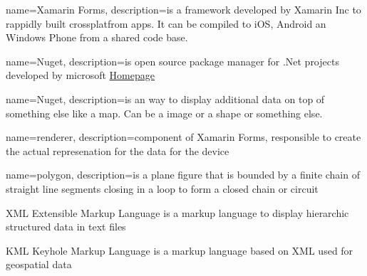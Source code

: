 
{
  name=Xamarin Forms,
  description={is a framework developed by Xamarin Inc to rappidly built crossplatfrom apps. It can be compiled to iOS, Android an Windows Phone from a shared code base.}
}

{
  name=Nuget,
  description={is open source package manager for .Net projects developed by microsoft
  \href{http://nuget.codeplex.com/}{Homepage} }
}

{
  name=Nuget,
  description={is an way to display additional data on top of something else like a map. Can be a image or a shape or something else.}
}

{
  name=renderer,
  description={component of Xamarin Forms, responsible to create the actual represenation for the data for the device}
}

{
  name=polygon,
  description={is a plane figure that is bounded by a finite chain of straight line segments closing in a loop to form a closed chain or circuit}
}

  {XML}            %
  {Extensible Markup Language}  %
  {is a markup language to display hierarchic structured data in text files} %

  {KML}            %
  {Keyhole Markup Language}  %
  {is a markup language based on XML used for geospatial data} %



